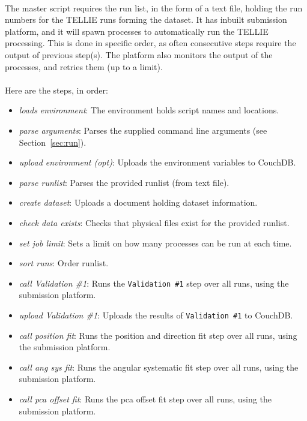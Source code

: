 \documentclass[12pt]{article}
\begin{document}
\paragraph{}
The master script requires the run list, in the form of a text file, holding the run numbers for the TELLIE runs forming the dataset. It has inbuilt submission platform, and it will spawn processes to automatically run the TELLIE processing. This is done in specific order, as often consecutive steps require the output of previous step(s). The platform also monitors the output of the processes, and retries them (up to a limit).

\paragraph{}
Here are the steps, in order:
\begin{itemize}
	\item \textit{loads environment}: The environment holds script names and locations.
	\item \textit{parse arguments}: Parses the supplied command line arguments (see Section~\ref{sec:run}).
	\item \textit{upload environment (opt)}: Uploads the environment variables to CouchDB.  
	\item \textit{parse runlist}: Parses the provided runlist (from text file). 
	\item \textit{create dataset}: Uploads a document holding dataset information. 
	\item \textit{check data exists}: Checks that physical files exist for the provided runlist. 
	\item \textit{set job limit}: Sets a limit on how many processes can be run at each time. 
	\item \textit{sort runs}: Order runlist. 
	\item \textit{call Validation \#1}: Runs the \texttt{Validation \#1} step over all runs, using the submission platform. 
	\item \textit{upload Validation \#1}: Uploads the results of \texttt{Validation \#1} to CouchDB.
	\item \textit{call position fit}: Runs the position and direction fit step over all runs, using the submission platform. 
	\item \textit{call ang sys fit}: Runs the angular systematic fit step over all runs, using the submission platform. 
	\item \textit{call pca offset fit}: Runs the pca offset fit step over all runs, using the submission platform. 

\end{itemize}
\end{document}
